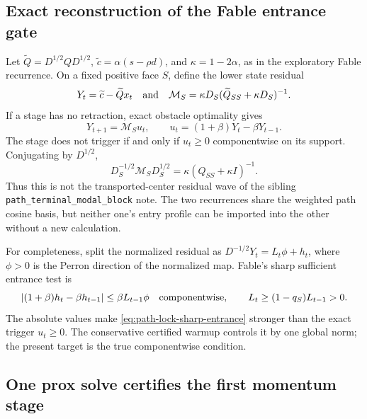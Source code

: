 \documentclass[11pt]{article}
\begin{document}
\subsection{Exact reconstruction of the Fable entrance gate}
\label{sec:gate-reconstruction}

Let \(\widetilde Q=D^{1/2}QD^{1/2}\),
\(\widetilde c=\alpha(s-\rho d)\), and
\(\kappa=1-2\alpha\), as in the exploratory Fable recurrence.  On a fixed
positive face \(S\), define the lower state residual
\begin{equation}
 Y_t=\widetilde c-\widetilde Qx_t
 \quad\hbox{and}\quad
 \mathcal M_S=\kappa D_S
 (\widetilde Q_{SS}+\kappa D_S)^{-1}.
 \label{eq:path-lock-hat-residual-map}
\end{equation}
If a stage has no retraction, exact obstacle optimality gives
\begin{equation}
 Y_{t+1}=\mathcal M_Su_t,
 \qquad
 u_t=(1+\beta)Y_t-\beta Y_{t-1}.
 \label{eq:path-lock-trigger-recurrence}
\end{equation}
The stage does not trigger if and only if \(u_t\geq0\) componentwise on its
support.  Conjugating by \(D^{1/2}\),
\begin{equation}
 D_S^{-1/2}\mathcal M_SD_S^{1/2}
 =\kappa(Q_{SS}+\kappa I)^{-1}.
 \label{eq:path-lock-normalized-map}
\end{equation}
Thus this is not the transported-center residual wave of the sibling
\texttt{path\_terminal\_modal\_block} note.  The two recurrences share the
weighted path cosine basis, but neither one's entry profile can be imported
into the other without a new calculation.

For completeness, split the normalized residual as
\(D^{-1/2}Y_t=L_t\phi+h_t\), where \(\phi>0\) is the Perron direction of the
normalized map.  Fable's sharp sufficient entrance test is
\begin{equation}
 \left|(1+\beta)h_t-\beta h_{t-1}\right|
 \leq \beta L_{t-1}\phi
 \quad\hbox{componentwise},
 \qquad
 L_t\geq(1-q_S)L_{t-1}>0.
 \label{eq:path-lock-sharp-entrance}
\end{equation}
The absolute values make
\eqref{eq:path-lock-sharp-entrance} stronger than the exact trigger
\(u_t\geq0\).  The conservative certified warmup controls it by one global
norm; the present target is the true componentwise condition.

\subsection{One prox solve certifies the first momentum stage}
\label{sec:first-momentum-safe}
\end{document}
